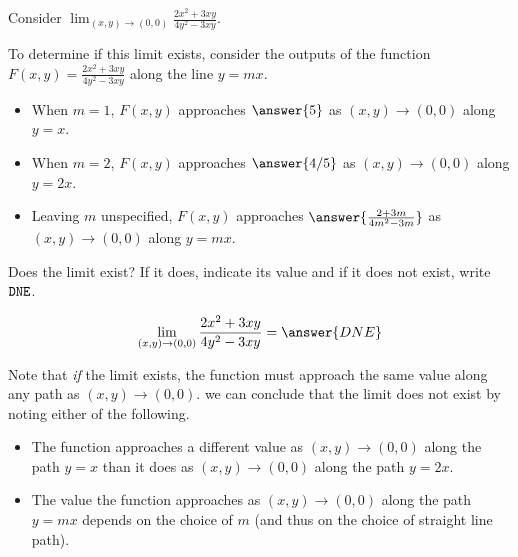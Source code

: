 \documentclass{ximera}
\author{Jim Talamo \and Bart Snapp}
\newcommand{\point}[1]{\left(#1\right)} %
\begin{document}
\begin{exercise}

Consider $ \lim_{\point{x,y}\to \point{0,0}}\frac{2x^2+3 x y}{4y^2-3xy}$.
    
    To determine if this limit exists, consider the outputs of the function $F(x,y) = \frac{2x^2+3 x y}{4y^2-3xy}$ along the line $y = m x$.
    \begin{itemize}
    \item When $m = 1$, $F(x,y)$ approaches $\answer{5}$ as $\point{x,y} \to \point{0,0}$ along $y= x$.
    \item When $m = 2$, $F(x,y)$ approaches  $\answer{4/5}$  as $\point{x,y} \to \point{0,0}$ along $y= 2 x$.
    \item Leaving $m$ unspecified, $F(x,y)$ approaches  $\answer{\frac{2+3m}{4m^2-3m}}$  as $\point{x,y} \to \point{0,0}$ along $y= m x$.
    \end{itemize}
  
\begin{exercise}  
  Does the limit exist? If it does, indicate its value and if it does not exist, write $\verb|DNE|$.

  \[
  \lim_{\point{x,y}\to \point{0,0}}\frac{2x^2+3 x y}{4y^2-3xy} = \answer{DNE}
  \]
  
  \begin{feedback}[correct]
  Note that \emph{if} the limit exists, the function must approach the same value along any path as $\point{x,y} \to \point{0,0}$.  we can conclude that the limit does not exist by noting either of the following.
  
  \begin{itemize}
  \item The function approaches a different value as $\point{x,y} \to \point{0,0}$ along the path $y=x$ than it does as $\point{x,y} \to \point{0,0}$ along the path $y=2x$.
  \item The value the function approaches as $\point{x,y} \to \point{0,0}$ along the path $y=mx$ depends on the choice of $m$ (and thus on the choice of straight line path).
  \end{itemize}
  \end{feedback}
 \end{exercise}
\end{exercise}
\end{document}
